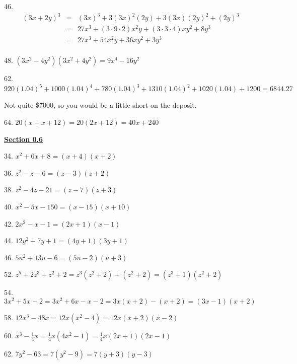 \documentclass[letterpaper]{article}
\begin{document}
\bigskip

46.
\begin{eqnarray*}
(3x+2y)^3 &=& (3x)^3+3(3x)^2(2y)+3(3x)(2y)^2+(2y)^3 \\
          &=& 27x^3+(3\cdot9\cdot2)x^2y+(3\cdot3\cdot4)xy^2+8y^3 \\
          &=& 27x^3+54x^2y+36xy^2+3y^3 \\
\end{eqnarray*}

48. $(3x^2-4y^2)(3x^2+4y^2)=9x^4-16y^2$

\bigskip

62. $920(1.04)^5+1000(1.04)^4+780(1.04)^3+1310(1.04)^2+1020(1.04)+1200=6844.27$

Not quite \$7000, so you would be a little short on the deposit.

\bigskip

64. $20(x+x+12)=20(2x+12)=40x+240$

\bigskip

\underline{\textbf{Section 0.6}}

\bigskip

34. $x^2+6x+8=(x+4)(x+2)$

\bigskip

36. $z^2-z-6=(z-3)(z+2)$

\bigskip

38. $z^2-4z-21=(z-7)(z+3)$

\bigskip

40. $x^2-5x-150=(x-15)(x+10)$

\bigskip

42. $2x^2-x-1=(2x+1)(x-1)$

\bigskip

44. $12y^2+7y+1=(4y+1)(3y+1)$

\bigskip

46. $5u^2+13u-6=(5u-2)(u+3)$

\bigskip

52. $z^5+2z^3+z^2+2=z^3(z^2+2)+(z^2+2)=(z^3+1)(z^2+2)$

\bigskip

54. $3x^2+5x-2=3x^2+6x-x-2=3x(x+2)-(x+2)=(3x-1)(x+2)$

\bigskip

58. $12x^3-48x=12x(x^2-4)=12x(x+2)(x-2)$

\bigskip

60. $x^3-\frac{1}{4}x=\frac{1}{4}x(4x^2-1)=\frac{1}{4}x(2x+1)(2x-1)$

\bigskip

62. $7y^2-63=7(y^2-9)=7(y+3)(y-3)$
\end{document}

